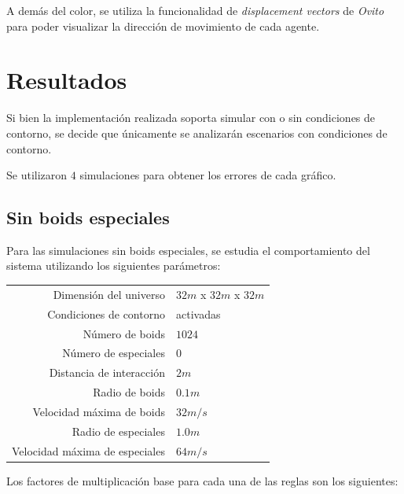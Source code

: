 \documentclass[a4paper]{article}
\begin{document}
            A demás del color, se utiliza la funcionalidad de \textit{displacement vectors} de \textit{Ovito} para poder visualizar la dirección de movimiento de cada agente.

    \section{Resultados}
        Si bien la implementación realizada soporta simular con o sin condiciones de contorno, se decide que únicamente se analizarán escenarios con condiciones de contorno.

        Se utilizaron $4$ simulaciones para obtener los errores de cada gráfico.

        \subsection{Sin boids especiales}
            Para las simulaciones sin boids especiales, se estudia el comportamiento del sistema utilizando los siguientes parámetros:
                \begin{table}[h]
                    \centering
                    \begin{tabular}{|r|l|}
                        \hline
                        Dimensión del universo & $32m$ x $32m$ x $32m$ \\
                        Condiciones de contorno & activadas \\
                        Número de boids & $1024$ \\
                        Número de especiales & $0$ \\
                        Distancia de interacción & $2m$ \\
                        Radio de boids & $0.1m$ \\
                        Velocidad máxima de boids & $32 m/s$ \\
                        Radio de especiales & $1.0m$ \\
                        Velocidad máxima de especiales & $64 m/s$ \\
                        \hline
                    \end{tabular}
                \end{table}

            Los factores de multiplicación base para cada una de las reglas son los siguientes:
\end{document}
